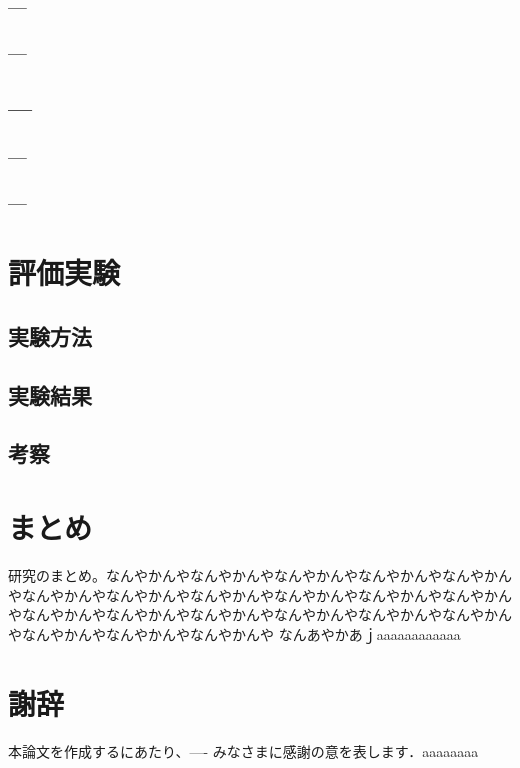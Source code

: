 \documentclass[11pt,a4j]{jreport}
\begin{document}
\subsection{---}
\subsection{---}
\section{---}
\subsection{---}
\subsection{---}

\chapter{評価実験}
\section{実験方法}
\section{実験結果}
\section{考察}

\chapter{まとめ}
研究のまとめ。なんやかんやなんやかんやなんやかんやなんやかんやなんやかんやなんやかんやなんやかんやなんやかんやなんやかんやなんやかんやなんやかんやなんやかんやなんやかんやなんやかんやなんやかんやなんやかんやなんやかんやなんやかんやなんやかんやなんやかんや
なんあやかあｊaaaaaaaaaaaa
\chapter*{謝辞} %
本論文を作成するにあたり、---- みなさまに感謝の意を表します．aaaaaaaa


\renewcommand{\bibname}{参考文献} %
\end{document}
